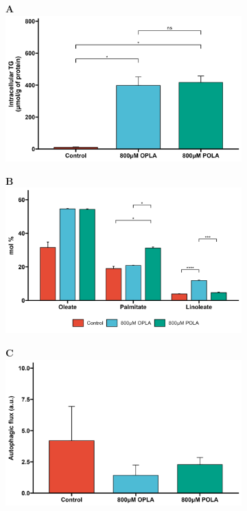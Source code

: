 \begin{figure}[h!]
     \centering
     \begin{subfigure}[b]{0.49\textwidth}
     \textbf{A}
         \centering
         \includegraphics[width=\textwidth]{figures/ch3-Model Development/OPLAPOLA TG.png}
     \end{subfigure}
     \hfill
     \begin{subfigure}[b]{0.49\textwidth}
     \textbf{B}
         \centering
         \includegraphics[width=\textwidth]{figures/ch3-Model Development/OPLAPOLA Lipid contributions.png}
     \end{subfigure}
     \hfill
      \begin{subfigure}[b]{0.49\textwidth}
      \textbf{C}
         \centering
         \includegraphics[width=\textwidth]{figures/ch3-Model Development/OPLAPOLA ATG FLX.png}

\end{subfigure}
\end{figure}
